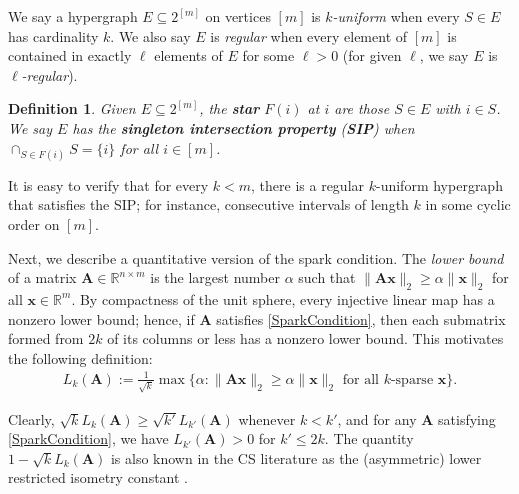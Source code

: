 \documentclass[9pt,twocolumn]{pnas-new}
\newtheorem{proposition}{Proposition}
\newtheorem{definition}{Definition}
\begin{document}
We say a hypergraph $E \subseteq 2^{[m]}$ on vertices $[m]$ is \textit{$k$-uniform} when every $S \in E$ has cardinality $k$. We also say $E$ is \emph{regular} when every element of $[m]$ is contained in exactly $\ell$ elements of $E$ for some $\ell > 0$ (for given $\ell$, we say $E$ is \textit{$\ell$-regular}).

\begin{definition}\label{sip}
Given $E \subseteq 2^{[m]}$, the \textbf{star} $F(i)$ at $i$ are those $S \in E$ with $i \in S$. We say $E$ has the \textbf{singleton intersection property} (\textbf{SIP}) when $\cap_{S \in F(i)} S = \{i\}$ for all $i \in [m]$. 
\end{definition}

It is easy to verify that for every $k < m$, there is a regular $k$-uniform hypergraph that satisfies the SIP; for instance, consecutive intervals of length $k$ in some cyclic order on $[m]$.

Next, we describe a quantitative version of the spark condition.  %
The \emph{lower bound} \cite{Grcar10} of a matrix $\mathbf{A} \in \mathbb R^{n \times m}$ is the largest number $\alpha$ such that \mbox{$\|\mathbf{A}\mathbf{x}\|_2 \geq \alpha\|\mathbf{x}\|_2$} for all $\mathbf{x} \in \mathbb{R}^m$. By compactness of the unit sphere, every injective linear map has a nonzero lower bound; hence, if $\mathbf{A}$ satisfies \eqref{SparkCondition}, then each submatrix formed from $2k$ of its columns or less has a nonzero lower bound. This motivates the following definition: %
\begin{align*}
L_k(\mathbf{A}) := \frac{1}{\sqrt{k}}\max \{ \alpha : \|\mathbf{A}\mathbf{x}\|_2 \geq \alpha\|\mathbf{x}\|_2 \text{ for all $k$-sparse } \mathbf{x}\}.
\end{align*} 

Clearly, $\sqrt{k} L_k(\mathbf{A}) \geq \sqrt{k'}L_{k'}(\mathbf{A})$ whenever $k < k'$, and for any $\mathbf{A}$ satisfying \eqref{SparkCondition}, we have $L_{k'}(\mathbf{A}) > 0$ for  $k' \leq 2k$. The quantity $1 - \sqrt{k} L_k(\mathbf{A})$ is also known in the CS literature as the (asymmetric) lower restricted isometry constant \cite{Blanchard2011, Foucart2009}.
\end{document}
